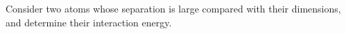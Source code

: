 Consider two atoms whose separation is large compared with their dimensions, and determine their interaction energy.
